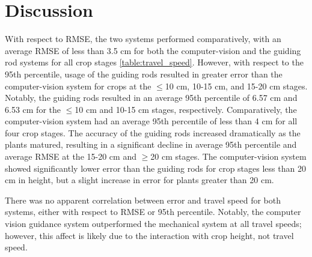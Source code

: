 \documentclass[authoryear]{elsarticle}
\begin{document}
\begin{table}[h]
  \centering
  \caption{RMSE and 95$^{th}$ Percentile with respect to travel speed.}
 \label{table:travel_speed}
\end{table}

\section{Discussion}
With respect to RMSE, the two systems performed comparatively, with an
average RMSE of less than 3.5 cm for both the computer-vision and the
guiding rod systems for all crop stages \ref{table:travel_speed}. However, with
respect to the 95th percentile, usage of the guiding rods resulted in
greater error than the computer-vision system for crops at the $\le$10 cm,
10-15 cm, and 15-20 cm stages. Notably, the guiding rods resulted in
an average 95th percentile of 6.57 cm and 6.53 cm for the $\le$10 cm and
10-15 cm stages, respectively. Comparatively, the computer-vision
system had an average 95th percentile of less than 4 cm for all four
crop stages. The accuracy of the guiding rods increased dramatically
as the plants matured, resulting in a significant decline in average
95th percentile and average RMSE at the 15-20 cm and $\ge$20 cm
stages. The computer-vision system showed significantly lower error
than the guiding rods for crop stages less than 20 cm in height, but a
slight increase in error for plants greater than 20 cm. 

There was no apparent correlation between error and travel speed for
both systems, either with respect to RMSE or 95th percentile. Notably,
the computer vision guidance system outperformed the mechanical system
at all travel speeds; however, this affect is likely due to the
interaction with crop height, not travel speed.
\end{document}
